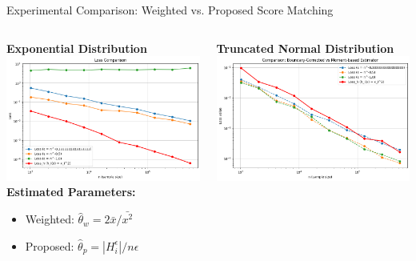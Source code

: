 \documentclass[aspectratio=169]{beamer}
\begin{document}
\begin{frame}{Experimental Comparison: Weighted  vs. Proposed Score Matching}
\begin{columns}
  \begin{column}{0.48\textwidth}
    \centering
    \textbf{Exponential Distribution} \\[0.5em]
    \includegraphics[width=\linewidth]{exp_result.png} \\[0.5em]

    \textbf{Estimated Parameters:}
    \begin{itemize}
      \item Weighted: \quad \( \hat{\theta}_w = 2\bar{x}/\bar{x^2}  \)
      \item Proposed: \quad \( \hat{\theta}_p = |H_i^\epsilon|/n\epsilon \)
    \end{itemize}
  \end{column}

  \begin{column}{0.48\textwidth}
    \centering
    \textbf{Truncated Normal Distribution} \\[0.5em]
    \includegraphics[width=\linewidth]{truncnorm_result.png} \\[0.5em]


\end{column}
\end{columns}
\end{frame}
\end{document}
